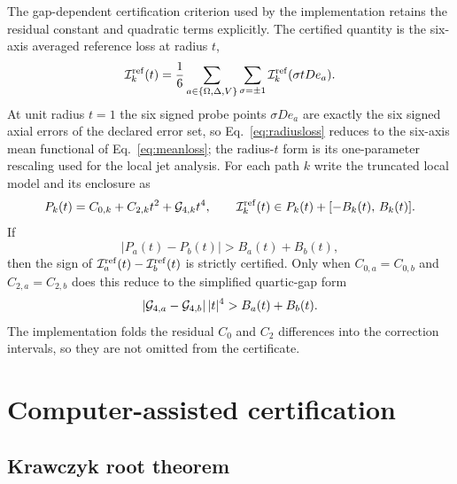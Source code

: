The gap-dependent certification criterion used by the implementation retains the residual
constant and quadratic terms explicitly. The certified quantity is the six-axis averaged
reference loss at radius $t$,
\begin{equation}\label{eq:radiusloss}
\mathcal{I}^{\mathrm{ref}}_{k}(t)=\frac{1}{6}\sum_{a\in\{\Omega,\Delta,V\}}\sum_{\sigma=\pm1}
\mathcal{I}^{\mathrm{ref}}_{k}(\sigma t D e_{a}).
\end{equation}
At unit radius $t=1$ the six signed probe points $\sigma D e_{a}$ are exactly the six
signed axial errors of the declared error set, so Eq.~\eqref{eq:radiusloss} reduces to the
six-axis mean functional of Eq.~\eqref{eq:meanloss}; the radius-$t$ form is its
one-parameter rescaling used for the local jet analysis.
For each path $k$ write the truncated local model and its enclosure as
\begin{equation}\label{eq:truncated}
P_{k}(t)=C_{0,k}+C_{2,k}t^{2}+\mathcal{G}_{4,k}t^{4},\qquad
\mathcal{I}^{\mathrm{ref}}_{k}(t)\in P_{k}(t)+[-B_{k}(t),\,B_{k}(t)].
\end{equation}
If
\begin{equation}\label{eq:gaptest}
\lvert P_{a}(t)-P_{b}(t)\rvert > B_{a}(t)+B_{b}(t),
\end{equation}
then the sign of $\mathcal{I}^{\mathrm{ref}}_{a}(t)-\mathcal{I}^{\mathrm{ref}}_{b}(t)$ is strictly certified. Only when
$C_{0,a}=C_{0,b}$ and $C_{2,a}=C_{2,b}$ does this reduce to the simplified quartic-gap form
\[
\lvert\mathcal{G}_{4,a}-\mathcal{G}_{4,b}\rvert\,\lvert t\rvert^{4} > B_{a}(t)+B_{b}(t).
\]
The implementation folds the residual $C_{0}$ and $C_{2}$ differences into the correction
intervals, so they are not omitted from the certificate.

\section{Computer-assisted certification}\label{sec:certification}

\subsection{Krawczyk root theorem}

